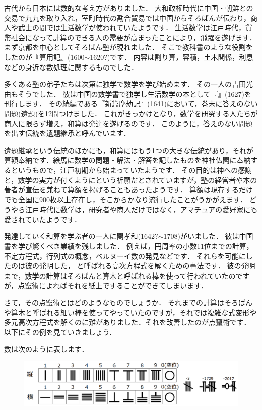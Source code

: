 \documentclass[./main]{subfiles}
\begin{document}


古代から日本には数的な考え方がありました． 大和政権時代に中国・朝鮮との交易で九九を取り入れ，室町時代の勘合貿易では中国からそろばんが伝わり，商人や武士の間では生活数学が使われていたようです． 生活数学は江戸時代，貨幣社会になって計算のできる人の需要が高まったことにより，飛躍を遂げます． まず京都を中心としてそろばん塾が現れました． そこで教科書のような役割をしたのが『算用記』(1600$\sim$1620?)です． 内容は割り算，容積，土木関係，利息などの身近な数処理に関するものでした．

多くある塾の弟子たちは次第に独学で数学を学び始めます． その一人の吉田光由もそうでした． 彼は中国の数学書で独学し生活数学の本として『』(1627)を刊行します． その続編である『新篇塵劫記』(1641)において，巻末に答えのない問題(遺題)を12問つけました． これがきっかけとなり，数学を研究する人たちが商人に限らず増え，和算は発達を遂げるのです． このように，答えのない問題を出す伝統を遺題継承と呼んでいます．

遺題継承という伝統のほかにも，和算にはもう1つの大きな伝統があり，それが算額奉納です．絵馬に数学の問題・解法・解答を記したものを神社仏閣に奉納するというもので，江戸初期から始まっていたようです． その目的は神への感謝と，数学の実力が付くようにという祈願だとされていますが，塾の経営者や本の著者が宣伝を兼ねて算額を掲げることもあったようです． 算額は現存するだけでも全国に900枚以上存在し，そこからかなり流行したことがうかがえます． どうやら江戸時代に数学は，研究者や商人だけではなく，アマチュアの愛好家にも愛されていたようです．

発達していく和算を学ぶ者の一人に関孝和(1642?$\sim$1708)がいました． 彼は中国書を学び驚くべき業績を残しました． 例えば，円周率の小数11位までの計算，不定方程式，行列式の概念，ベルヌーイ数の発見などです． それらを可能にしたのは彼の発明した， と呼ばれる高次方程式を解くための書法です． 彼の発明まで，数学の計算はそろばんと算木と呼ばれる棒を使って行われていたのですが，点竄術によればそれを紙上ですることができてしまいます．



さて，その点竄術とはどのようなものでしょうか． それまでの計算はそろばんや算木と呼ばれる細い棒を使ってやっていたのですが，それでは複雑な式変形や多元高次方程式を解くのに難がありました．それを改善したのが点竄術です． 以下にその例を見ていきましょう．

数は次のように表します．

\begin{figure}[H]
\begin{center}
\includegraphics[width=18cm]{ookuwa0.png}
\end{center}
\end{figure}
\end{document}
